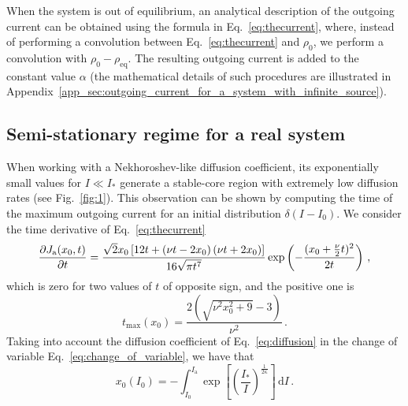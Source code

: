 {When the system is out of equilibrium, an analytical description of the outgoing current can be obtained using the formula in Eq.~\eqref{eq:thecurrent}, where, instead of performing a convolution between Eq.~\eqref{eq:thecurrent} and $\rho_0$, we perform a convolution with $\rho_0 - \rho_\text{eq}$. The resulting outgoing current is added to the constant value $\alpha$ (the mathematical details of such procedures are illustrated in Appendix~\ref{app_sec:outgoing_current_for_a_system_with_infinite_source}).


\subsection{Semi-stationary regime for a real system}
\label{subsec:semi_stationary_regime_for_a_real_system}


When working with a Nekhoroshev-like diffusion coefficient, its exponentially small values for $I \ll I_\ast$ generate a stable-core region with extremely low diffusion rates (see Fig.~\ref{fig:1}). This observation can be shown by computing the time of the maximum outgoing current for an initial distribution $\delta(I - I_0)$. We consider the time derivative of Eq.~\eqref{eq:thecurrent}
\begin{equation}
\pdv{J_\mathrm{a}(x_0, t)}{t} = \frac{\sqrt{2} x_0 \left[12 t + \left(\nu t - 2 x_0\right) \left(\nu t + 2 x_0\right)\right] }{16 \sqrt{\pi t^7}}\exp\left(-\frac{(x_0+\frac{\nu}{2}t)^2}{2t}\right)\,,
\end{equation}
which is zero for two values of $t$ of opposite sign, and the positive one is
\begin{equation}
    t_{\text{max}}(x_0) = \frac{2 \left(\sqrt{\nu^{2} x_0^{2} + 9} - 3\right)}{\nu^{2}}\,.
    \label{eq:taumax}
\end{equation}
Taking into account the diffusion coefficient of Eq.~\eqref{eq:diffusion} in the change of variable Eq.~\eqref{eq:change_of_variable}, we have that
\begin{equation}
    x_0(I_0) = {-}\int_{I_0}^{I_\mathrm{a}} \exp\left[\left(\frac{I_\ast}{I}\right)^{\frac{1}{2\kappa}}\right]\,\mathrm{d}I\,.
    \label{eq:peak_current_time}
\end{equation}

}
